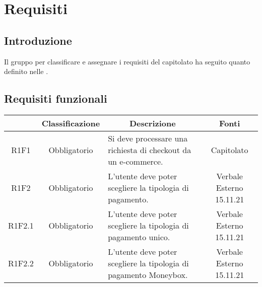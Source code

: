 \section{Requisiti} \label{section:requisiti}

\subsection{Introduzione}
Il gruppo \groupName{} per classificare e assegnare i requisiti del capitolato ha seguito quanto definito nelle \docNameVersionNdP{}.

\subsection{Requisiti funzionali} \label{subsection:requisiti_funzionali}
\begin{table}[H]
    \centering
    \renewcommand{\arraystretch}{1.8}
    \begin{tabular}{c | c | p{6cm} | c}
        \rowcolor[HTML]{125E28}
        \multicolumn{1}{c}{\color[HTML]{FFFFFF} \textbf{Codice}}          &
        \multicolumn{1}{c}{\color[HTML]{FFFFFF} \textbf{Classificazione}} &
        \multicolumn{1}{c}{\color[HTML]{FFFFFF} \textbf{Descrizione}}     &
        \multicolumn{1}{c}{\color[HTML]{FFFFFF} \textbf{Fonti}}                                                                                                                                             \\
        \hline
        R1F1                                                              & Obbligatorio & Si deve processare una richiesta di checkout da un e-commerce\glo{}.                  & Capitolato               \\
        R1F2                                                              & Obbligatorio & L'utente deve poter scegliere la tipologia di pagamento.                              & Verbale Esterno 15.11.21 \\
        R1F2.1                                                            & Obbligatorio & L'utente deve poter scegliere la tipologia di pagamento unico.                        & Verbale Esterno 15.11.21 \\
        R1F2.2                                                            & Obbligatorio & L'utente deve poter scegliere la tipologia di pagamento Moneybox\glo{}.               & Verbale Esterno 15.11.21 \\

\end{tabular}
\end{table}

